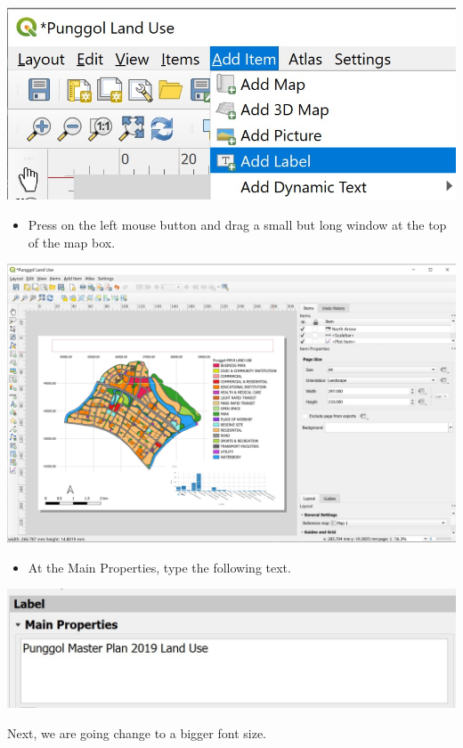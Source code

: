 \documentclass[
  letterpaper,
  DIV=11,
  numbers=noendperiod]{scrreprt}
\providecommand{\tightlist}{%
  \setlength{\itemsep}{0pt}\setlength{\parskip}{0pt}}\usepackage{longtable,booktabs,array}
\begin{document}
\includegraphics{./img04/image82.jpg}

\begin{itemize}
\tightlist
\item
  Press on the left mouse button and drag a small but long window at the
  top of the map box.
\end{itemize}

\includegraphics{./img04/image83.jpg}

\begin{itemize}
\tightlist
\item
  At the Main Properties, type the following text.
\end{itemize}

\includegraphics{./img04/image84.jpg}

Next, we are going change to a bigger font size.
\end{document}

